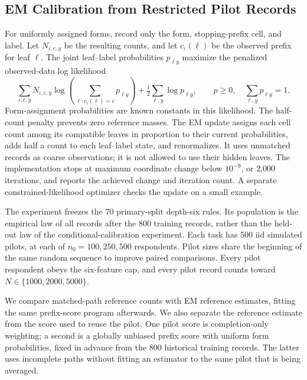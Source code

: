 


\subsection{EM Calibration from Restricted Pilot Records}\label{app:em}
For uniformly assigned forms, record only the form, stopping-prefix cell,
and label. Let $N_{\iota,c,y}$ be the resulting counts, and let $c_\iota(\ell)$ be
the observed prefix for leaf $\ell$. The joint leaf--label probabilities
$p_{\ell y}$ maximize the penalized observed-data log likelihood
\[
 \sum_{\iota,c,y}N_{\iota,c,y}\log\!\left(\sum_{\ell:c_\iota(\ell)=c}p_{\ell y}\right)
       +\tfrac12\sum_{\ell,y}\log p_{\ell y},
 \qquad p\ge0,\quad\sum_{\ell,y}p_{\ell y}=1.
\]
Form-assignment probabilities are known constants in this likelihood.
The half-count penalty prevents zero reference masses. The EM update
assigns each cell count among its compatible leaves in proportion to their
current probabilities, adds half a count to each leaf--label state, and
renormalizes. It uses unmatched records as coarse observations; it is not
allowed to use their hidden leaves. The implementation stops at maximum
coordinate change below $10^{-9}$, or 2,000 iterations, and reports the
achieved change and iteration count. A separate constrained-likelihood
optimizer checks the update on a small example.

The experiment freezes the 70 primary-split depth-six rules. Its population is the empirical law
of all records after the 800 training records, rather than the held-out
law of the conditional-calibration experiment. Each task has
500 iid simulated pilots, at each of $n_0=100,250,500$ respondents. Pilot
sizes share the beginning of the same random sequence to improve paired
comparisons. Every pilot respondent obeys the six-feature cap, and every
pilot record counts toward $N\in\{1000,2000,5000\}$.

We compare matched-path reference counts with EM reference estimates,
fitting the same prefix-score program afterwards. We also separate the
reference estimate from the score used to reuse the pilot. One pilot score
is completion-only weighting; a second is a globally unbiased prefix score
with uniform form probabilities, fixed in advance from the 800 historical
training records. The latter uses incomplete paths without fitting an
estimator to the same pilot that is being averaged.

